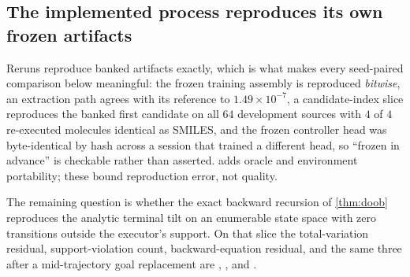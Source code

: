 
\subsection{The implemented process reproduces its own frozen artifacts}
\label{sec:exp-correctness}

Reruns reproduce banked artifacts exactly, which is what makes every seed-paired comparison below meaningful: the frozen training assembly is reproduced \emph{bitwise}, an extraction path agrees with its reference to $1.49\times10^{-7}$, a candidate-index slice reproduces the banked first candidate on all $64$ development sources with $4$ of $4$ re-executed molecules identical as SMILES, and the frozen controller head was byte-identical by hash across a session that trained a different head, so ``frozen in advance'' is checkable rather than asserted.
 adds oracle and environment portability; these bound reproduction error, not quality.

The remaining question is whether the exact backward recursion of \cref{thm:doob} reproduces the analytic terminal tilt on an enumerable state space with zero transitions outside the executor's support. On that slice the total-variation residual, support-violation count, backward-equation residual, and the same three after a mid-trajectory goal replacement are \XXX{}, \XXX{}, \XXX{} and \XXX{}.

